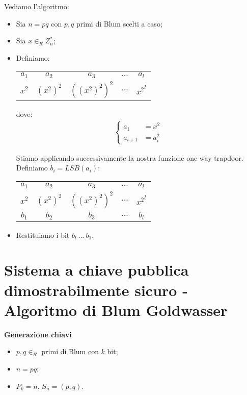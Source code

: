 \noindent Vediamo l'algoritmo:
\begin{itemize}
    \item Sia $n = pq$ con $p, q$ primi di Blum scelti a caso;
    \item Sia $x \in_R Z_n^*$;
    \item Definiamo:
    \begin{center}
            \begin{tabular}{ c c c c c }
              $a_1$ & $a_2$ & $a_3$ & $...$ & $a_l$\\
              \vspace{1cm}
              $x^2$ & ${(x^2)}^2$ & ${({(x^2)}^2)}^2$ & $...$ & ${x^2}^{l}$\\
            \end{tabular}
        \end{center}

    \noindent dove:
    \begin{align*}
         \begin{cases}
            a_1 &= x^2\\ 
            a_{i+1} &= a_i^2
        \end{cases}
    \end{align*}

    \noindent Stiamo applicando successivamente la nostra funzione one-way trapdoor. Definiamo $b_i = LSB(a_i)$:
    \begin{center}
            \begin{tabular}{ c c c c c }
              $a_1$ & $a_2$ & $a_3$ & $...$ & $a_l$\\
              \vspace{1cm}
              $x^2$ & ${(x^2)}^2$ & ${({(x^2)}^2)}^2$ & $...$ & ${x^2}^{l}$\\
              $b_1$ & $b_2$ & $b_3$ & $...$ & $b_l$\\
            \end{tabular}
        \end{center}
    \item Restituiamo i bit $b_l \ ... \ b_1$.
        
\end{itemize}

\section{Sistema a chiave pubblica dimostrabilmente sicuro - Algoritmo di Blum Goldwasser}
\textbf{Generazione chiavi} 
\begin{itemize}
    \item $p, q \in_R $ primi di Blum con $k$ bit;
    \item $n = pq$;
    \item $P_k = n$, $S_n=(p, q)$.
\end{itemize}


